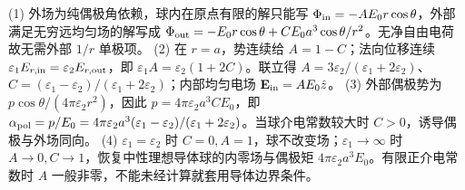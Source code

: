 (1) 外场为纯偶极角依赖，球内在原点有限的解只能写 \(\Phi_{\rm in}=-A E_0r\cos\theta\)，外部满足无穷远均匀场的解写成 \(\Phi_{\rm out}=-E_0r\cos\theta+C E_0a^3\cos\theta/r^2\)。无净自由电荷故无需外部 \(1/r\) 单极项。
(2) 在 \(r=a\)，势连续给 \(A=1-C\)；法向位移连续 \(\varepsilon_1E_{r,\rm in}=\varepsilon_2E_{r,\rm out}\)，即 \(\varepsilon_1 A=\varepsilon_2(1+2C)\)。联立得 \(A=3\varepsilon_2/(\varepsilon_1+2\varepsilon_2)\)、\(C=(\varepsilon_1-\varepsilon_2)/(\varepsilon_1+2\varepsilon_2)\)；内部均匀电场 \(\mathbf E_{\rm in}=AE_0\hat z\)。
(3) 外部偶极势为 \(p\cos\theta/(4\pi\varepsilon_2r^2)\)，因此 \(p=4\pi\varepsilon_2a^3 C E_0\)，即 \(\alpha_{\rm pol}=p/E_0=4\pi\varepsilon_2a^3(\varepsilon_1-\varepsilon_2)/(\varepsilon_1+2\varepsilon_2)\)。当球介电常数较大时 \(C>0\)，诱导偶极与外场同向。
(4) \(\varepsilon_1=\varepsilon_2\) 时 \(C=0,A=1\)，球不改变场；\(\varepsilon_1\to\infty\) 时 \(A\to0,C\to1\)，恢复中性理想导体球的内零场与偶极矩 \(4\pi\varepsilon_2a^3E_0\)。有限正介电常数时 \(A\) 一般非零，不能未经计算就套用导体边界条件。
